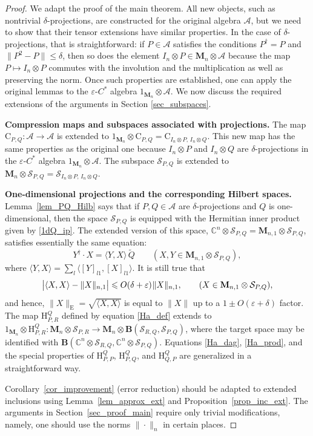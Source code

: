 \documentclass[12pt]{article}
\newcommand{\CC}{\mathbb{C}}
\newcommand{\calA}{\mathcal{A}}
\newcommand{\calS}{\mathcal{S}}
\newcommand{\ts}{\mkern1mu}
\newcommand{\Bo}{\mathbf{B}}
\newcommand{\Co}{\mathrm{C}}
\newcommand{\Ha}{\mathrm{H}}
\newcommand{\Euc}{\mathrm{E}}
\newcommand{\wt}{\widetilde}
\newcommand*{\Ma}[1]{\mathbf{M}_{#1}}
\newcommand*{\braket}[2]{\langle{#1},{#2}\rangle}
\newcommand{\eps}{\varepsilon}
\renewcommand{\le}{\leqslant}
\newtheorem[definition]{Definition}[Theorem]{Definition}
\newtheorem[remark]{Example}[Theorem]{Example}
\newtheorem[remark]{Remark}[Theorem]{Remark}
\newtheorem[remark]{Question}[Theorem]{Open question}
\newtheorem*[definition]{definition}{Definition}
\newtheorem*[remark]{example}{Example}
\newtheorem*[remark]{remark}{Remark}
\newtheorem*[remark]{question}{Open question}
\numberwithin{equation}{section}
\begin{document}
\begin{proof} We adapt the proof of the main theorem. All new objects, such as nontrivial $\delta$-projections, are constructed for the original algebra $\calA$, but we need to show that their tensor extensions have similar properties. In the case of $\delta$-projections, that is straightforward: if $P\in\calA$ satisfies the conditions $P^\dag=P$ and $\|P^2-P\|\le\delta$, then so does the element $I_n\otimes P\in\Ma{n}\otimes\calA$ because the map $P\mapsto I_n\otimes P$ commutes with the involution and the multiplication as well as preserving the norm. Once such properties are established, one can apply the original lemmas to the $\eps$-$C^*$ algebra $1_{\Ma{n}}\otimes\calA$. We now discuss the required extensions of the arguments in Section \ref{sec_subspaces}.\medskip

\noindent\textbf{Compression maps and subspaces associated with projections.} The map $\Co_{P,Q}\colon\calA\to\calA$ is extended to $1_{\Ma{n}}\otimes\Co_{P,Q}=\Co_{I_n\otimes P,\,I_n\otimes Q}$. This new map has the same properties as the original one because $I_n\otimes P$ and $I_n\otimes Q$ are $\delta$-projections in the $\eps$-$C^*$ algebra $1_{\Ma{n}}\otimes\calA$. The subspace $\calS_{P,Q}$ is extended to $\Ma{n}\otimes\calS_{P,Q}=\calS_{I_n\otimes P,\,I_n\otimes Q}$.\medskip

\noindent\textbf{One-dimensional projections and the corresponding Hilbert spaces.} Lemma~\ref{lem_PQ_Hilb} says that if $P,Q\in\calA$ are $\delta$-projections and $Q$ is one-dimensional, then the space $\calS_{P,Q}$ is equipped with the Hermitian inner product given by \eqref{1dQ_ip}. The extended version of this space, $\CC^n\otimes\calS_{P,Q}=\Ma{n,1}\otimes\calS_{P,Q}$, satisfies essentially the same equation:
\begin{equation}\label{1dQ_ip_ext}
Y^\dag\cdot X=\braket{Y}{X}\,\wt{Q}\qquad (X,Y\in\Ma{n,1}\otimes\calS_{P,Q}),
\end{equation}
where $\braket{Y}{X}=\sum_{l}\braket{[Y]_{l1}}{[X]_{l1}}$. It is still true that
\begin{equation}\label{1dQ_ip_norm_ext}
\bigl|\braket{X}{X}-\|X\|_{n,1}\bigr| \le O(\delta+\eps)\ts\|X\|_{n,1},\qquad
(X\in\Ma{n,1}\otimes\calS_{P,Q}),
\end{equation}
and hence, $\|X\|_\Euc=\sqrt{\braket{X}{X}}$ is equal to $\|X\|$ up to a $1\pm O(\eps+\delta)$ factor. The map $\Ha^{Q}_{P,R}$ defined by equation \eqref{Ha_def} extends to $1_{\Ma{n}}\otimes\Ha^{Q}_{P,R}\colon \Ma{n}\otimes\calS_{P,R}\to\Ma{n}\otimes\Bo(\calS_{R,Q},\calS_{P,Q})$, where the target space may be identified with $\Bo(\CC^n\otimes\calS_{R,Q},\CC^n\otimes\calS_{P,Q})$. Equations \eqref{Ha_dag}, \eqref{Ha_prod}, and the special properties of $\Ha^{Q}_{P,P}$, $\Ha^{Q}_{P,Q}$, and $\Ha^{Q}_{Q,P}$ are generalized in a straightforward way.\medskip

Corollary~\ref{cor_improvement} (error reduction) should be adapted to extended inclusions using Lemma~\ref{lem_approx_ext} and Proposition~\ref{prop_inc_ext}. The arguments in Section~\ref{sec_proof_main} require only trivial modifications, namely, one should use the norms $\|\cdot\|_n$ in certain places.
\end{proof}
\end{document}
